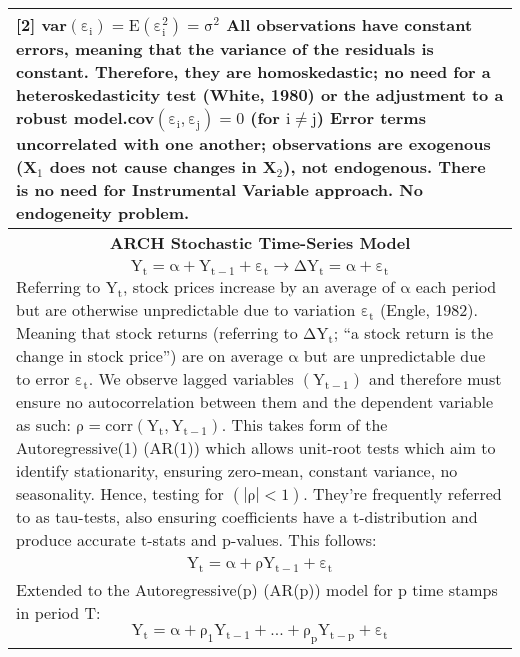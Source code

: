 \documentclass[11pt, english]{article}
\begin{document}
\begin{center}
\begin{longtable}{p{14cm}}
                [2] var$\mathrm{(\varepsilon_i)=E(\varepsilon_i^2)=\sigma^2}$\newline\newline
                All observations have constant errors, meaning that the variance of the residuals is constant. Therefore, they are homoskedastic; no need for a heteroskedasticity test (White, 1980) or the adjustment to a robust model.\newline\newline
                [3] cov$\mathrm{(\varepsilon_i,\varepsilon_j)=0}$ (for $\mathrm{i\neq j}$)\newline\newline
                Error terms uncorrelated with one another; observations are exogenous (X$_1$ does not cause changes in X$_2$), not endogenous. There is no need for Instrumental Variable approach. No endogeneity problem.\\
                \hline
                \multicolumn{1}{c}{\textbf{ARCH Stochastic Time-Series Model}}\\
                \hline
                $$\mathrm{Y_t=\alpha+Y_{t-1}+\varepsilon_t\rightarrow\Delta Y_t=\alpha+\varepsilon_t}$$
		Referring to $\mathrm{Y_t}$, stock prices increase by an average of $\mathrm{\alpha}$ each period but are otherwise unpredictable due to variation $\mathrm{\varepsilon_t}$ (Engle, 1982). Meaning that stock returns (referring to $\mathrm{\Delta Y_t}$; ``a stock return is the change in stock price'') are on average $\mathrm{\alpha}$ but are unpredictable due to error $\mathrm{\varepsilon_t}$.\newline\newline
                We observe lagged variables $\mathrm{(Y_{t-1})}$ and therefore must ensure no autocorrelation between them and the dependent variable as such: $\mathrm{\rho=corr\left(Y_t,Y_{t-1}\right)}$. This takes form of the Autoregressive(1) (AR(1)) which allows unit-root tests which aim to identify stationarity, ensuring zero-mean, constant variance, no seasonality. Hence, testing for $\mathrm{\left(|\rho|<1\right)}$. They're frequently referred to as tau-tests, also ensuring coefficients have a t-distribution and produce accurate t-stats and p-values. This follows:\\
                $$\mathrm{Y_t=\alpha+\rho Y_{t-1}+\varepsilon_t}$$\\
                Extended to the Autoregressive(p) (AR(p)) model for p time stamps in period T:
                $$\mathrm{Y_t=\alpha+\rho_1Y_{t-1}+...+\rho_pY_{t-p}+\varepsilon_t}$$

\end{longtable}
\end{center}
\end{document}
